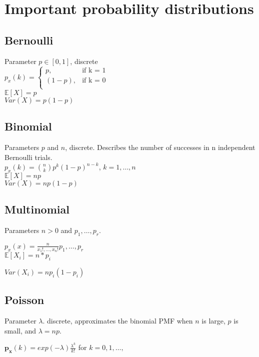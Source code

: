 \section{Important probability distributions}
\subsection*{Bernoulli}
Parameter $p \in[0,1]$, discrete\\
$ p_x(k)=
	\begin{cases}
		 p,&\text{if k = 1}\\
		(1-p),&\text{if k = 0}\\
	\end{cases}
$\\
$\mathbb{E}[X]=p$\\
$Var(X)=p(1-p)$\\

\subsection*{Binomial}
Parameters $p$ and $n$, discrete. Describes the number of successes
in n independent Bernoulli trials.\\

$p_x(k)= {n\choose k}{p}^{k} \left( 1-p \right) ^{n-k}$, $k=1,\ldots, n$\\

$\mathbb{E}[X]=np$\\

$Var(X)= np(1-p)$

\subsection*{Multinomial}

Parameters $n>0$ and $p_1, \ldots, p_r$.

$p_x(x)= \frac{n}{x_1!,\ldots,x_n!} p_1, \ldots, p_r$\\


$\mathbb{E}[X_i]=n*p_i$

$Var(X_i)=np_i(1-p_i)$


\subsection*{Poisson}
Parameter $\lambda$. discrete, approximates the binomial PMF when $n$ is large, $p$ is small, and $\lambda = np$.

$\mathbf{p_x}(k)=exp(-\lambda)\frac{\lambda^k}{k!}$ for $k=0,1, \ldots,$\\

